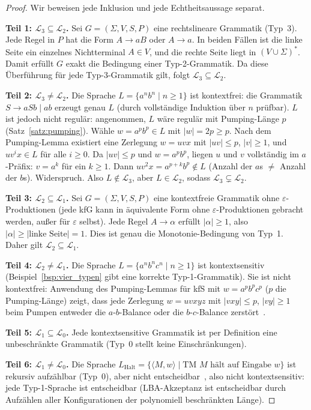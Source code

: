 ﻿\documentclass[a4paper,12pt]{article}
\theoremstyle{definition}
\begin{document}
\begin{proof}
Wir beweisen jede Inklusion und jede Echtheitsaussage separat.

\medskip
\textbf{Teil 1: $\mathcal{L}_3 \subseteq \mathcal{L}_2$.}
Sei $G = (\Sigma, V, S, P)$ eine rechtslineare Grammatik (Typ~3).
Jede Regel in $P$ hat die Form $A \to aB$ oder $A \to a$.
In beiden F\"allen ist die linke Seite ein einzelnes Nichtterminal $A \in V$,
und die rechte Seite liegt in $(V \cup \Sigma)^*$. Damit erf\"ullt $G$
exakt die Bedingung einer Typ-2-Grammatik. Da diese \"Uberf\"uhrung f\"ur
jede Typ-3-Grammatik gilt, folgt $\mathcal{L}_3 \subseteq \mathcal{L}_2$.

\medskip
\textbf{Teil 2: $\mathcal{L}_3 \neq \mathcal{L}_2$.}
Die Sprache $L = \{a^n b^n \mid n \geq 1\}$ ist kontextfrei:
die Grammatik $S \to aSb \mid ab$ erzeugt genau $L$ (durch vollst\"andige
Induktion \"uber $n$ pr\"ufbar). $L$ ist jedoch nicht regul\"ar:
angenommen, $L$ w\"are regul\"ar mit Pumping-L\"ange $p$ (Satz~\ref{satz:pumping}).
W\"ahle $w = a^p b^p \in L$ mit $|w| = 2p \geq p$.
Nach dem Pumping-Lemma existiert eine Zerlegung $w = uvx$ mit $|uv| \leq p$,
$|v| \geq 1$, und $uv^i x \in L$ f\"ur alle $i \geq 0$.
Da $|uv| \leq p$ und $w = a^p b^p$, liegen $u$ und $v$ vollst\"andig im
$a$-Pr\"afix: $v = a^k$ f\"ur ein $k \geq 1$.
Dann $uv^2 x = a^{p+k} b^p \notin L$ (Anzahl der $a$s $\neq$ Anzahl der $b$s).
Widerspruch. Also $L \notin \mathcal{L}_3$, aber $L \in \mathcal{L}_2$,
sodass $\mathcal{L}_3 \subsetneq \mathcal{L}_2$.

\medskip
\textbf{Teil 3: $\mathcal{L}_2 \subseteq \mathcal{L}_1$.}
Sei $G = (\Sigma, V, S, P)$ eine kontextfreie Grammatik ohne $\varepsilon$-Produktionen
(jede kfG kann in \"aquivalente Form ohne $\varepsilon$-Produktionen gebracht werden,
au{\ss}er f\"ur $\varepsilon$ selbst). Jede Regel $A \to \alpha$ erf\"ullt
$|\alpha| \geq 1$, also $|\alpha| \geq |\text{linke Seite}| = 1$.
Dies ist genau die Monotonie-Bedingung von Typ~1.
Daher gilt $\mathcal{L}_2 \subseteq \mathcal{L}_1$.

\medskip
\textbf{Teil 4: $\mathcal{L}_2 \neq \mathcal{L}_1$.}
Die Sprache $L = \{a^n b^n c^n \mid n \geq 1\}$ ist kontextsensitiv
(Beispiel~\ref{bsp:vier_typen} gibt eine korrekte Typ-1-Grammatik).
Sie ist nicht kontextfrei: Anwendung des Pumping-Lemmas f\"ur kfS
mit $w = a^p b^p c^p$ ($p$ die Pumping-L\"ange) zeigt, dass jede
Zerlegung $w = uvxyz$ mit $|vxy| \leq p$, $|vy| \geq 1$ beim Pumpen
entweder die $a$-$b$-Balance oder die $b$-$c$-Balance zerst\"ort~\cite{sipser2013}.

\medskip
\textbf{Teil 5: $\mathcal{L}_1 \subseteq \mathcal{L}_0$.}
Jede kontextsensitive Grammatik ist per Definition eine unbeschr\"ankte Grammatik
(Typ~0 stellt keine Einschr\"ankungen).

\medskip
\textbf{Teil 6: $\mathcal{L}_1 \neq \mathcal{L}_0$.}
Die Sprache $L_{\mathrm{Halt}} = \{\langle M, w \rangle \mid
\text{TM } M \text{ h\"alt auf Eingabe } w\}$ ist rekursiv aufz\"ahlbar
(Typ~0), aber nicht entscheidbar~\cite{turing1936}, also nicht kontextsensitiv:
jede Typ-1-Sprache ist entscheidbar (LBA-Akzeptanz ist entscheidbar durch
Aufz\"ahlen aller Konfigurationen der polynomiell beschr\"ankten L\"ange).
\end{proof}
\end{document}
